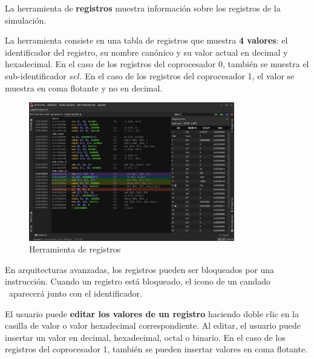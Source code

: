 La herramienta de \textbf{registros} muestra información sobre
los registros de la simulación.

La herramienta consiste en una tabla de registros
que muestra \textbf{4 valores}: el identificador del registro,
su nombre canónico y su valor actual en decimal y hexadecimal.
En el caso de los registros del coprocesador 0,
también se muestra el sub-identificador $sel$.
En el caso de los registros del coprocesador 1,
el valor se muestra en coma flotante y no en decimal.

\begin{figure}[H]
    \centering
    \includegraphics[width=0.8\textwidth]{images/tools/jams-registers}
    \caption{Herramienta de registros}
    \label{fig:jams-registers}
\end{figure}

En arquitecturas avanzadas, los registros pueden ser
bloqueados por una instrucción.
Cuando un registro está bloqueado, el icono de un candado \faLock \
aparecerá junto con el identificador.

El usuario puede \textbf{editar los valores de un registro}
haciendo doble clic en la casilla de valor
o valor hexadecimal correspondiente.
Al editar, el usuario puede insertar un valor en decimal,
hexadecimal, octal o binario.
En el caso de los registros del coprocesador 1,
también se pueden insertar valores en coma flotante.